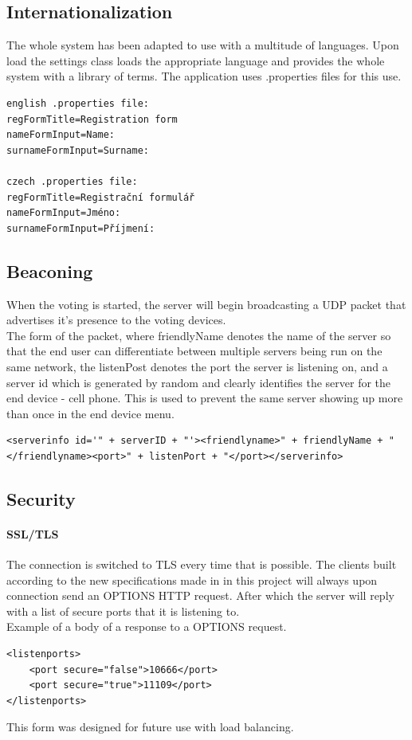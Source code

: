 \documentclass[11pt,twoside,a4paper]{book}
\begin{document}
\subsection{Internationalization}
The whole system has been adapted to use with a multitude of languages. Upon load the settings class loads the appropriate language and provides the whole system with a library of terms. The application uses .properties files for this use.



\begin{lstlisting}
english .properties file:
regFormTitle=Registration form
nameFormInput=Name:
surnameFormInput=Surname:

czech .properties file:
regFormTitle=Registrační formulář
nameFormInput=Jméno:
surnameFormInput=Příjmení:
\end{lstlisting}

\subsection{Beaconing}
When the voting is started, the server will begin broadcasting a UDP packet that advertises it's presence to the voting devices. \\

The form of the packet, where friendlyName denotes the name of the server so that the end user can differentiate between multiple servers being run on the same network, the listenPost denotes the port the server is listening on, and a server id which is generated by random and clearly identifies the server for the end device - cell phone. This is used to prevent the same server showing up more than once in the end device menu.
\begin{lstlisting}
<serverinfo id='" + serverID + "'><friendlyname>" + friendlyName + "</friendlyname><port>" + listenPort + "</port></serverinfo>
\end{lstlisting}
\subsection{Security}
\paragraph{SSL/TLS}
The connection is switched to TLS every time that is possible. The clients built according to the new specifications made in in this project will always upon connection send an OPTIONS HTTP request. After which the server will reply with a list of secure ports that it is listening to.\\
Example of a body of a response to a OPTIONS request.
\begin{lstlisting}
<listenports>
	<port secure="false">10666</port>
	<port secure="true">11109</port>
</listenports>
\end{lstlisting}
This form was designed for future use with load balancing.
\end{document}
